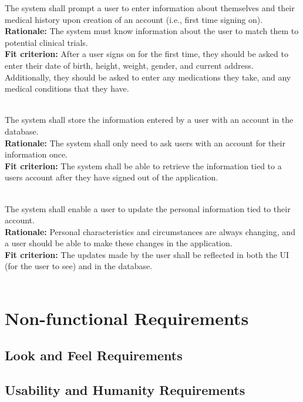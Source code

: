 \documentclass[12pt, titlepage]{article}
\newcounter{FR_Counter}
\begin{document}
The system shall prompt a user to enter information about themselves and their medical history 
upon creation of an account (i.e., first time signing on).\\
\textbf{Rationale:}
The system must know information about the user to match them to potential clinical trials.\\
\textbf{Fit criterion:}
After a user signs on for the first time, they should be asked to enter their date of birth, height, weight, gender, and 
current address. Additionally, they should be asked to enter any medications they take, and any medical conditions that they have.\\~\\
\addtocounter{FR_Counter}{1}

The system shall store the information entered by a user with an account in the database.\\
\textbf{Rationale:}
The system shall only need to ask users with an account for their information once.\\
\textbf{Fit criterion:}
The system shall be able to retrieve the information tied to a users account after they have signed out of the application. \\~\\
\addtocounter{FR_Counter}{1}


The system shall enable a user to update the personal information tied to their account.\\
\textbf{Rationale:}
Personal characteristics and circumstances are always changing, and a user should be able to make these changes in the application.\\
\textbf{Fit criterion:}
The updates made by the user shall be reflected in both the UI (for the user to see) and in the database.\\~\\
\addtocounter{FR_Counter}{1}

\section{Non-functional Requirements}

\subsection{Look and Feel Requirements}

\subsection{Usability and Humanity Requirements}
\end{document}
